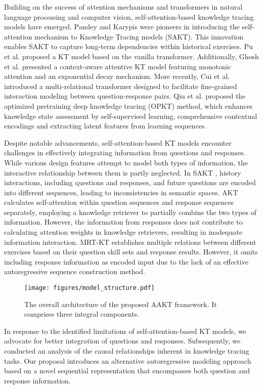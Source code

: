 Building on the success of attention mechanisms and transformers \cite{Attention} in natural language processing and computer vision, self-attention-based knowledge tracing models have emerged. Pandey and Karypis \cite{SAKT} were pioneers in introducing the self-attention mechanism to Knowledge Tracing models (SAKT). This innovation enables SAKT to capture long-term dependencies within historical exercises. Pu et al. \cite{VanillaTrKT} proposed a KT model based on the vanilla transformer. Additionally, Ghosh et al. \cite{AKT} presented a context-aware attentive KT model featuring monotonic attention and an exponential decay mechanism. More recently, Cui et al. \cite{MRTKT} introduced a multi-relational transformer designed to facilitate fine-grained interaction modeling between question-response pairs. Qiu et al. \cite{OPKT} proposed the optimized pretraining deep knowledge tracing (OPKT) method, which enhances knowledge state assessment by self-supervised learning, comprehensive contextual encodings and extracting latent features from learning sequences.

{Despite notable advancements, self-attention-based KT models encounter challenges in effectively integrating information from questions and responses. While various design features attempt to model both types of information, the interactive relationship between them is partly neglected. In SAKT \cite{SAKT}, history interactions, including questions and responses, and future questions are encoded into different sequences, leading to inconsistencies in semantic spaces. AKT \cite{AKT} calculates self-attention within question sequences and response sequences separately, employing a knowledge retriever to partially combine the two types of information. However, the information from responses does not contribute to calculating attention weights in knowledge retrievers, resulting in inadequate information interaction. MRT-KT \cite{MRTKT} establishes multiple relations between different exercises based on their question skill sets and response results. However, it omits including response information as encoded input due to the lack of an effective autoregressive sequence construction method.}

\begin{figure*}[ht]
\centering
\texttt{[image: figures/model\_structure.pdf]}
\caption{The overall architecture of the proposed AAKT framework. It comprises three integral components. }
\label{fig:model structure}
\end{figure*}

{In response to the identified limitations of self-attention-based KT models, we advocate for better integration of questions and responses. Subsequently, we conducted an analysis of the causal relationships inherent in knowledge tracing tasks. Our proposal introduces an alternative autoregressive modeling approach based on a novel sequential representation that encompasses both question and response information.}